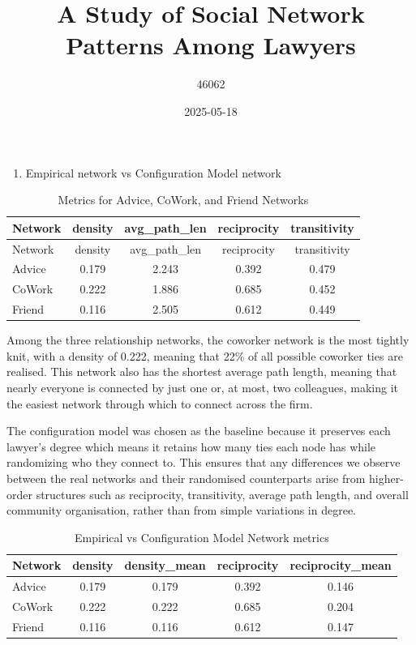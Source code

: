 \documentclass[
]{article}
\title{A Study of Social Network Patterns Among Lawyers}
\author{46062}
\date{2025-05-18}
\providecommand{\tightlist}{%
  \setlength{\itemsep}{0pt}\setlength{\parskip}{0pt}}
\begin{document}
\maketitle

\begin{enumerate}
\def\labelenumi{\arabic{enumi}.}
\tightlist
\item
  Empirical network vs Configuration Model network
\end{enumerate}

\begin{longtable}[]{@{}lcccc@{}}
\caption{Metrics for Advice, CoWork, and Friend Networks}\tabularnewline
\toprule\noalign{}
Network & density & avg\_path\_len & reciprocity & transitivity \\
\midrule\noalign{}
\endfirsthead
\toprule\noalign{}
Network & density & avg\_path\_len & reciprocity & transitivity \\
\midrule\noalign{}
\endhead
\bottomrule\noalign{}
\endlastfoot
Advice & 0.179 & 2.243 & 0.392 & 0.479 \\
CoWork & 0.222 & 1.886 & 0.685 & 0.452 \\
Friend & 0.116 & 2.505 & 0.612 & 0.449 \\
\end{longtable}

Among the three relationship networks, the coworker network is the most
tightly knit, with a density of 0.222, meaning that 22\% of all possible
coworker ties are realised. This network also has the shortest average
path length, meaning that nearly everyone is connected by just one or,
at most, two colleagues, making it the easiest network through which to
connect across the firm.

The configuration model was chosen as the baseline because it preserves
each lawyer's degree which means it retains how many ties each node has
while randomizing who they connect to. This ensures that any differences
we observe between the real networks and their randomised counterparts
arise from higher-order structures such as reciprocity, transitivity,
average path length, and overall community organisation, rather than
from simple variations in degree.

\begin{longtable}[t]{lcccc}
\caption{\label{tab:configuration-network-stats}Empirical vs Configuration Model Network metrics}\\
\toprule
Network & density & density\_mean & reciprocity & reciprocity\_mean\\
\midrule
Advice & 0.179 & 0.179 & 0.392 & 0.146\\
CoWork & 0.222 & 0.222 & 0.685 & 0.204\\
Friend & 0.116 & 0.116 & 0.612 & 0.147\\
\bottomrule
\end{longtable}
\end{document}
